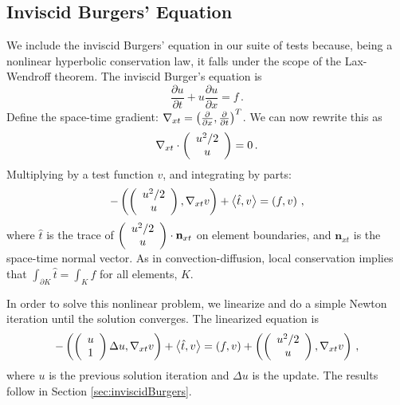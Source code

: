 \documentclass[Proposal.tex]{subfiles}
\begin{document}
\subsection{Inviscid Burgers' Equation}
We include the inviscid Burgers' equation in our suite of tests because, being
a nonlinear hyperbolic conservation law, it
falls under the scope of the Lax-Wendroff theorem. %
The inviscid Burger's equation is
\[
\frac{\partial u}{\partial t}+u\frac{\partial u}{\partial x}=f\,.
\]
Define the space-time gradient: $\nabla_{xt}=\left( \frac{\partial}{\partial
x},\frac{\partial}{\partial t} \right)^T$. We can now rewrite this as
\[
\nabla_{xt}\cdot\left( \begin{array}{c} u^2/2\\ u\\ \end{array} \right)=0\,.
\]
Multiplying by a test function $v$, and integrating by parts:
\[
-\left( \left( \begin{array}{c} u^2/2\\ u\\ \end{array} \right),\nabla_{xt}v \right)+\left\langle \hat t,v \right\rangle=\left( f,v \right)\,,
\]
where $\hat t$ is the trace of $\left( \begin{array}{c} u^2/2\\ u\\ \end{array} \right)\cdot\mathbf{n}_{xt}$ on
element boundaries, and $\mathbf{n}_{xt}$ is the space-time normal vector.
As in convection-diffusion, local conservation implies that
$\int_{\partial K}\hat t=\int_Kf$ for all elements, $K$.

In order to solve this nonlinear problem, we linearize and do a simple Newton iteration
until the solution converges. The linearized equation is
\[
-\left( \left( \begin{array}{c} u\\ 1\\ \end{array} \right)\Delta u,\nabla_{xt}v \right)+\left\langle \hat t,v \right\rangle=\left( f,v \right)
+\left( \left( \begin{array}{c} u^2/2\\ u\\ \end{array} \right),\nabla_{xt}v \right) \,,
\]
where $u$ is the previous solution iteration and $\Delta u$ is the update.
The results follow in Section \ref{sec:inviscidBurgers}.
\end{document}
